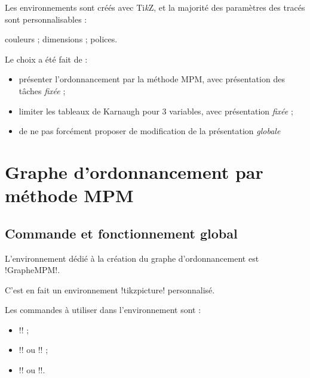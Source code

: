 \documentclass[french,a4paper,11pt]{article}
\providecommand\tikzlogo{Ti\textit{k}Z}
\let\TikZ\tikzlogo
\begin{document}
{\begin{tipblock}
Les environnements sont créés avec \TikZ, et la majorité des paramètres des tracés sont personnalisables :

\hfill{}couleurs ; dimensions ; polices.\hfill~
\end{tipblock}

\begin{noteblock}
Le choix a été fait de :

\begin{itemize}
	\item présenter l'ordonnancement par la méthode MPM, avec présentation des tâches \textit{fixée} ;
	\item limiter les tableaux de Karnaugh pour 3 variables, avec présentation \textit{fixée} ;
	\item de ne pas forcément proposer de modification de la présentation \textit{globale}
\end{itemize}
\vspace*{-\baselineskip}\leavevmode
\end{noteblock}

\pagebreak

\section{Graphe d'ordonnancement par méthode MPM}

\subsection{Commande et fonctionnement global}

\begin{cautionblock}
L'environnement dédié à la création du graphe d'ordonnancement est \motcletex!GrapheMPM!.

C'est en fait un environnement \motcletex!tikzpicture! personnalisé.

\smallskip

Les commandes à utiliser dans l'environnement sont :

\begin{itemize}
	\item \motcletex!\MPMPlaceNotice! ;
	\item \motcletex!\MPMPlaceTache! ou \motcletex!\MPMPlaceTaches! ;
	\item \motcletex!\MPMPlaceDuree! ou \motcletex!\MPMPlaceDurees!.
\end{itemize}
\vspace*{-\baselineskip}\leavevmode
\end{cautionblock}

}
\end{document}

